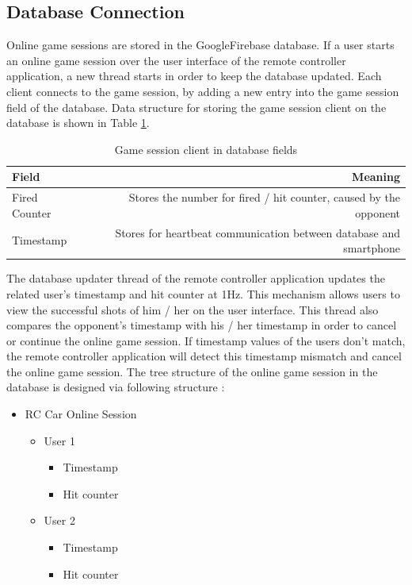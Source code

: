 \subsection{Database Connection} \label{sec_db_connection}
Online game sessions are stored in the Google\texttrademark\;Firebase database. If a user starts an online game session over the user interface of the remote controller application, a new thread starts in order to keep the database updated. Each client connects to the game session, by adding a new entry into the game session field of the database. Data structure for storing the game session client on the database is shown in Table \ref{tab:db_fields}.

\begin{table}[!htbp]
    \centering
    \caption{\label{tab:db_fields}Game session client in database fields}
    \begin{tabular}{l|r}
        Field & Meaning \\\hline
        Fired Counter & Stores the number for fired / hit counter, caused by the opponent \\
        Timestamp & Stores for heartbeat communication between database and smartphone \\
    \end{tabular}
\end{table}

The database updater thread of the remote controller application updates the related user's timestamp and hit counter at 1Hz. This mechanism allows users to view the successful shots of him / her on the user interface. This thread also compares the opponent's timestamp with his / her timestamp in order to cancel or continue the online game session. If timestamp values of the users don't match, the remote controller application will detect this timestamp mismatch and cancel the online game session. The tree structure of the online game session in the database is designed via following structure :

\begin{itemize}
    \item RC Car Online Session
    \begin{itemize}
        \item User 1
        \begin{itemize}
            \item Timestamp
            \item Hit counter
        \end{itemize}
        \item User 2
        \begin{itemize}
            \item Timestamp
            \item Hit counter
        \end{itemize}
    \end{itemize}
\end{itemize}





